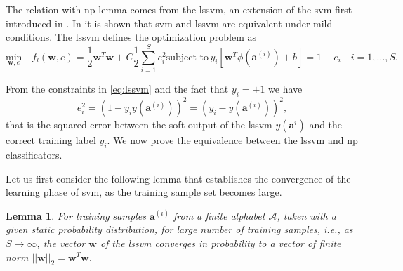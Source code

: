 \documentclass[draftcls,onecolumn,12pt]{IEEEtran}
\newtheorem{lemma}{Lemma}
\begin{document}
The relation with \ac{np} lemma comes from the \ac{lssvm}, an extension of the \ac{svm} first introduced in \cite{Suykens1999}. In \cite{Yevs} it is shown that  \ac{svm} and \ac{lssvm} are equivalent under mild conditions. The \ac{lssvm} defines the optimization problem as
\begin{subequations}
	\label{eq:lssvm}
	\begin{equation}
	\label{eq:lssvmOrig}
	\underset{\mathbf{w},e}{\text{min}} \quad f_l(\mathbf{w},e) = \frac{1}{2} \mathbf{w}^T \mathbf{w} + C \frac{1}{2} \sum_{i=1}^S e_i ^2 
	\end{equation}
	\begin{equation}
	\label{eq:stpart}
	\text{subject to}\,  y_i[\mathbf{w}^T \phi (\mathbf{a}^{(i)}) + b] = 1- e_i\quad i = 1 ,\dots,S.
	\end{equation}
\end{subequations}

From the constraints in \eqref{eq:lssvm} and the fact that $y_i = \pm 1$ we have
\begin{equation}
\label{eq:els}
e_i^2 = (1 - y_iy(\mathbf{a}^{(i)}) )^2 = (y_i - y(\mathbf{a}^{(i)}))^2,
\end{equation}
that is the squared error between the soft output of the \ac{lssvm} $y(\mathbf{a}^i)$ and the correct training label $y_i$. We now prove the equivalence between the \ac{lssvm} and \ac{np} classificators. 

Let us first consider the following lemma that establishes the convergence of the learning phase of \ac{svm}, as the training sample set becomes large.

\begin{lemma}
	\label{lem:lem1}
	For training samples $\bm{a}^{(i)}$ from a finite alphabet $\mathcal A$, taken with a given static probability distribution, for large number of training samples, i.e., as $S \rightarrow \infty$, the vector $\bm{w}$ of the \ac{lssvm} converges in probability to a vector of finite norm $||\mathbf{w}||_2 = \mathbf{w}^T\mathbf{w}$.
\end{lemma}
\end{document}
